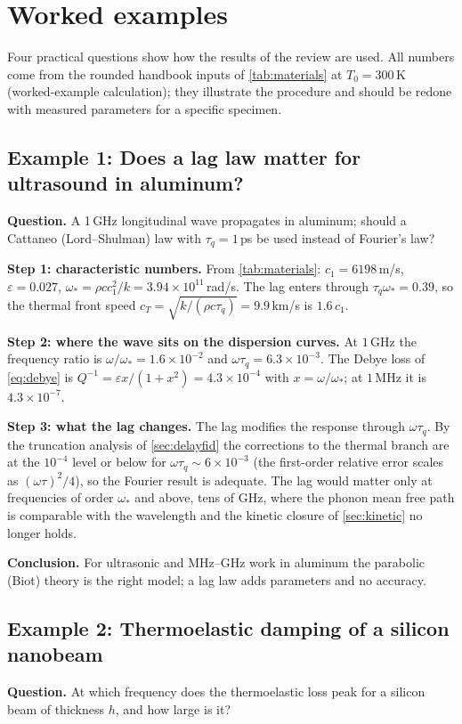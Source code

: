\section{Worked examples}\label{sec:examples}

Four practical questions show how the results of the review are used. All numbers come from the rounded handbook inputs of \cref{tab:materials} at $T_0=300$\,K (worked-example calculation); they illustrate the procedure and should be redone with measured parameters for a specific specimen.

\subsection{Example 1: Does a lag law matter for ultrasound in aluminum?}
\textbf{Question.} A 1\,GHz longitudinal wave propagates in aluminum; should a Cattaneo (Lord--Shulman) law with $\tau_q=1$\,ps be used instead of Fourier's law?

\textbf{Step 1: characteristic numbers.} From \cref{tab:materials}: $c_1=6198$\,m/s, $\varepsilon=0.027$, $\omega_*=\rho c c_1^2/k=3.94\times10^{11}$\,rad/s. The lag enters through $\tau_q\omega_*=0.39$, so the thermal front speed $c_T=\sqrt{k/(\rho c\tau_q)}=9.9$\,km/s is $1.6\,c_1$.

\textbf{Step 2: where the wave sits on the dispersion curves.} At $1$\,GHz the frequency ratio is $\omega/\omega_*=1.6\times10^{-2}$ and $\omega\tau_q=6.3\times10^{-3}$. The Debye loss of \cref{eq:debye} is $Q^{-1}=\varepsilon x/(1+x^2)=4.3\times10^{-4}$ with $x=\omega/\omega_*$; at $1$\,MHz it is $4.3\times10^{-7}$.

\textbf{Step 3: what the lag changes.} The lag modifies the response through $\omega\tau_q$. By the truncation analysis of \cref{sec:delayfid} the corrections to the thermal branch are at the $10^{-4}$ level or below for $\omega\tau_q\sim6\times10^{-3}$ (the first-order relative error scales as $(\omega\tau)^2/4$), so the Fourier result is adequate. The lag would matter only at frequencies of order $\omega_*$ and above, tens of GHz, where the phonon mean free path is comparable with the wavelength and the kinetic closure of \cref{sec:kinetic} no longer holds.

\textbf{Conclusion.} For ultrasonic and MHz--GHz work in aluminum the parabolic (Biot) theory is the right model; a lag law adds parameters and no accuracy.

\subsection{Example 2: Thermoelastic damping of a silicon nanobeam}
\textbf{Question.} At which frequency does the thermoelastic loss peak for a silicon beam of thickness $h$, and how large is it?


